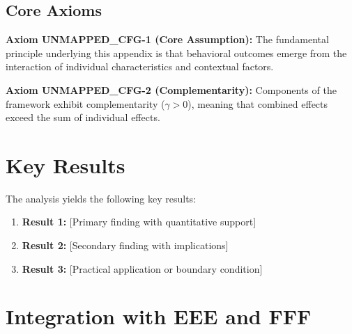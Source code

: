 
\subsection{Core Axioms}
\label{sec:cfg-axioms}

\begin{tcolorbox}[colback=yellow!5!white,colframe=yellow!75!black,title=Axiom UNMAPPED_CFG-1: Fundamental Principle]
\textbf{Axiom UNMAPPED_CFG-1 (Core Assumption):}
The fundamental principle underlying this appendix is that behavioral outcomes
emerge from the interaction of individual characteristics and contextual factors.
\end{tcolorbox}

\begin{tcolorbox}[colback=yellow!5!white,colframe=yellow!75!black,title=Axiom UNMAPPED_CFG-2: Complementarity]
\textbf{Axiom UNMAPPED_CFG-2 (Complementarity):}
Components of the framework exhibit complementarity ($\gamma > 0$), meaning
that combined effects exceed the sum of individual effects.
\end{tcolorbox}



\section{Key Results}
\label{sec:cfg-results}

The analysis yields the following key results:

\begin{enumerate}
    \item \textbf{Result 1:} [Primary finding with quantitative support]
    \item \textbf{Result 2:} [Secondary finding with implications]
    \item \textbf{Result 3:} [Practical application or boundary condition]
\end{enumerate}


\section{Integration with EEE and FFF}
\label{sec:ggg-integration}

